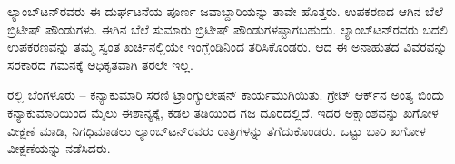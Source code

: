 ಲ್ಯಾಂಬ್​ಟನ್​ರವರು ಈ ದುರ್ಘಟನೆಯ ಪೂರ್ಣ ಜವಾಬ್ದಾರಿಯನ್ನು ತಾವೇ ಹೊತ್ತರು. ಉಪಕರಣದ ಆಗಿನ ಬೆಲೆ  ಬ್ರಿಟೀಷ್​ ಪೌಂಡುಗಳು. ಈಗಿನ ಬೆಲೆ ಸುಮಾರು  ಬ್ರಿಟೀಷ್​ ಪೌಂಡುಗಳಷ್ಟಾಗಬಹುದು. ಲ್ಯಾಂಬ್​ಟನ್​ರವರು ಬದಲಿ ಉಪಕರಣವನ್ನು ತಮ್ಮ ಸ್ವಂತ ಖರ್ಚಿನಲ್ಲಿಯೇ ಇಂಗ್ಲೆಂಡಿನಿಂದ ತರಿಸಿಕೊಂಡರು. ಆದ ಈ ಅನಾಹುತದ ವಿವರವನ್ನು ಸರಕಾರದ ಗಮನಕ್ಕೆ ಅಧಿಕೃತವಾಗಿ ತರಲೇ ಇಲ್ಲ.

\newpage

ರಲ್ಲಿ ಬೆಂಗಳೂರು – ಕನ್ಯಾಕುಮಾರಿ ಸರಣಿ ಟ್ರಾಂಗ್ಯುಲೇಷನ್​ ಕಾರ್ಯ\break ಮುಗಿಯಿತು. ಗ್ರೇಟ್​ ಆರ್ಕ್‌ನ ಅಂತ್ಯ ಬಿಂದು ಕನ್ಯಾಕುಮಾರಿಯಿಂದ  ಮೈಲು ಈಶಾನ್ಯಕ್ಕೆ, ಕಡಲ ತಡಿಯಿಂದ  ಗಜ ದೂರದಲ್ಲಿದೆ. ಇದರ ಅಕ್ಷಾಂಶವನ್ನು ಖಗೋಳ ವೀಕ್ಷಣೆ ಮಾಡಿ, ನಿಗಧಿಮಾಡಲು ಲ್ಯಾಂಬ್​ಟನ್​ರವರು  ರಾತ್ರಿಗಳನ್ನು ತೆಗೆದುಕೊಂಡರು. ಒಟ್ಟು  ಬಾರಿ ಖಗೋಳ ವೀಕ್ಷಣೆಯನ್ನು ನಡೆಸಿದರು.

